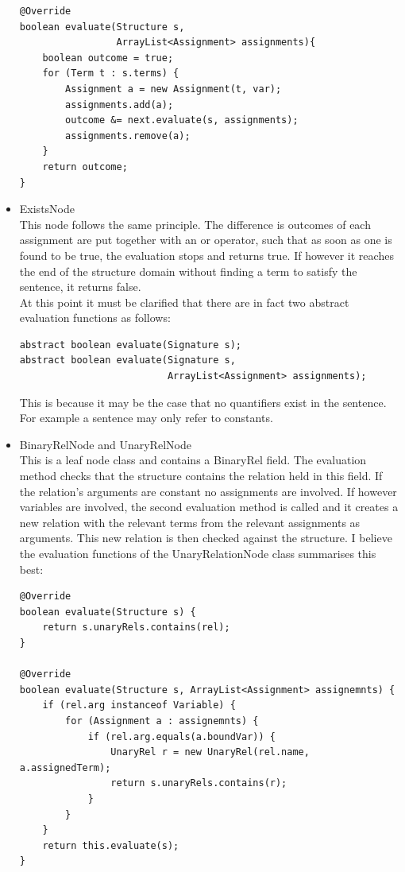 \documentclass{report}
\begin{document}
\begin{itemize}
\begin{verbatim}
@Override
boolean evaluate(Structure s,
                 ArrayList<Assignment> assignments){
    boolean outcome = true;
    for (Term t : s.terms) {
        Assignment a = new Assignment(t, var);
        assignments.add(a);
        outcome &= next.evaluate(s, assignments);
        assignments.remove(a);
    }
    return outcome;
}
\end{verbatim}
\newpage
\item ExistsNode\\
This node follows the same principle. The difference is outcomes of each 
assignment are put together with an or operator, such that as soon as one is 
found to be true, the evaluation stops and returns true. If however it reaches 
the end of the structure domain without finding a term to satisfy the sentence, 
it returns false.\\
At this point it must be clarified that there are in fact two abstract 
evaluation functions as follows:
\begin{verbatim}
abstract boolean evaluate(Signature s);
abstract boolean evaluate(Signature s, 
                          ArrayList<Assignment> assignments);
\end{verbatim}
This is because it may be the case that no quantifiers exist in the sentence. 
For example a sentence may only refer to constants.

\item BinaryRelNode and UnaryRelNode\\
This is a leaf node class and contains a BinaryRel field. The evaluation method 
checks that the structure contains the relation held in this field. If the 
relation's arguments are constant no assignments are involved. If however 
variables are involved, the second evaluation method is called and it creates a 
new relation with the relevant terms from the relevant assignments as arguments. 
This new relation is then checked against the structure. I believe the 
evaluation functions of the UnaryRelationNode class summarises this best:
\begin{verbatim}
@Override
boolean evaluate(Structure s) {
    return s.unaryRels.contains(rel);
}

@Override
boolean evaluate(Structure s, ArrayList<Assignment> assignemnts) {
    if (rel.arg instanceof Variable) {
        for (Assignment a : assignemnts) {
            if (rel.arg.equals(a.boundVar)) {
                UnaryRel r = new UnaryRel(rel.name, a.assignedTerm);
                return s.unaryRels.contains(r);
            }
        }
    }
    return this.evaluate(s);
}
\end{verbatim}


\end{itemize}
\end{document}

